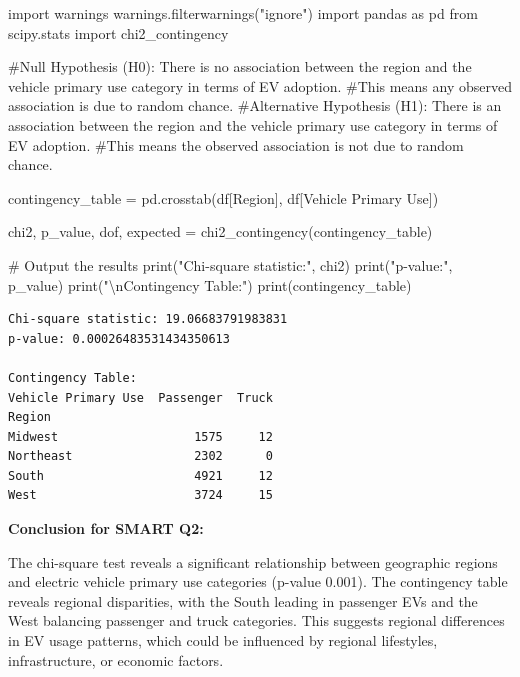 \documentclass[
  letterpaper,
  DIV=11,
  numbers=noendperiod]{scrartcl}
\newenvironment{Shaded}{\begin{snugshade}}{\end{snugshade}}
\newcommand{\BuiltInTok}[1]{\textcolor[rgb]{0.00,0.23,0.31}{#1}}
\newcommand{\CharTok}[1]{\textcolor[rgb]{0.13,0.47,0.30}{#1}}
\newcommand{\CommentTok}[1]{\textcolor[rgb]{0.37,0.37,0.37}{#1}}
\newcommand{\ImportTok}[1]{\textcolor[rgb]{0.00,0.46,0.62}{#1}}
\newcommand{\NormalTok}[1]{\textcolor[rgb]{0.00,0.23,0.31}{#1}}
\newcommand{\OperatorTok}[1]{\textcolor[rgb]{0.37,0.37,0.37}{#1}}
\newcommand{\StringTok}[1]{\textcolor[rgb]{0.13,0.47,0.30}{#1}}
\begin{document}
\begin{Shaded}
\begin{Highlighting}[]
\ImportTok{import}\NormalTok{ warnings}
\NormalTok{warnings.filterwarnings(}\StringTok{"ignore"}\NormalTok{)}
\ImportTok{import}\NormalTok{ pandas }\ImportTok{as}\NormalTok{ pd}
\ImportTok{from}\NormalTok{ scipy.stats }\ImportTok{import}\NormalTok{ chi2\_contingency}

\CommentTok{\#Null Hypothesis (H0): There is no association between the region and the vehicle primary use category in terms of EV adoption.}
\CommentTok{\#This means any observed association is due to random chance.}
\CommentTok{\#Alternative Hypothesis (H1): There is an association between the region and the vehicle primary use  category in terms of EV adoption. }
\CommentTok{\#This means the observed association is not due to random chance.}

\NormalTok{contingency\_table }\OperatorTok{=}\NormalTok{ pd.crosstab(df[}\StringTok{\textquotesingle{}Region\textquotesingle{}}\NormalTok{], df[}\StringTok{\textquotesingle{}Vehicle Primary Use\textquotesingle{}}\NormalTok{])}

\NormalTok{chi2, p\_value, dof, expected }\OperatorTok{=}\NormalTok{ chi2\_contingency(contingency\_table)}

\CommentTok{\# Output the results}
\BuiltInTok{print}\NormalTok{(}\StringTok{"Chi{-}square statistic:"}\NormalTok{, chi2)}
\BuiltInTok{print}\NormalTok{(}\StringTok{"p{-}value:"}\NormalTok{, p\_value)}
\BuiltInTok{print}\NormalTok{(}\StringTok{"}\CharTok{\textbackslash{}n}\StringTok{Contingency Table:"}\NormalTok{)}
\BuiltInTok{print}\NormalTok{(contingency\_table)}
\end{Highlighting}
\end{Shaded}

\begin{verbatim}
Chi-square statistic: 19.06683791983831
p-value: 0.00026483531434350613

Contingency Table:
Vehicle Primary Use  Passenger  Truck
Region                               
Midwest                   1575     12
Northeast                 2302      0
South                     4921     12
West                      3724     15
\end{verbatim}

\textbf{Conclusion for SMART Q2:}

The chi-square test reveals a significant relationship between
geographic regions and electric vehicle primary use categories (p-value
0.001). The contingency table reveals regional disparities, with the
South leading in passenger EVs and the West balancing passenger and
truck categories. This suggests regional differences in EV usage
patterns, which could be influenced by regional lifestyles,
infrastructure, or economic factors.
\end{document}
